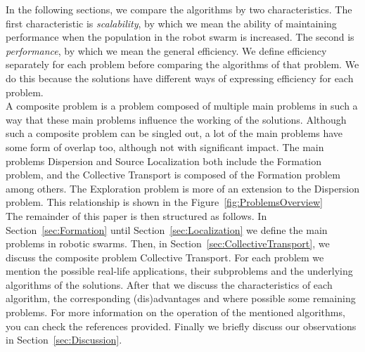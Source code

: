 In the following sections, we compare the algorithms by two characteristics. 
The first characteristic is \emph{scalability}, by which we mean the ability of maintaining performance when the population in the robot swarm is increased. 
The second is \emph{performance}, by which we mean the general efficiency. 
We define efficiency separately for each problem before comparing the algorithms of that problem. 
We do this because the solutions have different ways of expressing efficiency for each problem.\\

A composite problem is a problem composed of multiple main problems in such a way that these main problems influence the working of the solutions. 
Although such a composite problem can be singled out, a lot of the main problems have some form of overlap too, although not with significant impact. 
The main problems Dispersion and Source Localization both include the Formation problem, and the Collective Transport is composed of the Formation problem among others.
The Exploration problem is more of an extension to the Dispersion problem. 
This relationship is shown in the Figure~\ref{fig:ProblemsOverview} \\


The remainder of this paper is then structured as follows. 
In Section~\ref{sec:Formation} until Section~\ref{sec:Localization} we define the main problems in robotic swarms. 
Then, in Section~\ref{sec:CollectiveTransport}, we discuss the composite problem Collective Transport. 
For each problem we mention the possible real-life applications, their subproblems and the underlying algorithms of the solutions.
After that we discuss the characteristics of each algorithm, the corresponding (dis)advantages and where possible some remaining problems.
For more information on the operation of the mentioned algorithms, you can check the references provided. 
Finally we briefly discuss our observations in Section~\ref{sec:Discussion}.



